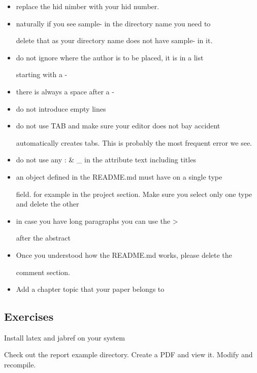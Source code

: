 \begin{itemize}

\item
  replace the hid nimber with your hid number.
\item naturally if you see sample- in the directory name you need to

  delete that as your directory name does not have sample- in it.
\item do not ignore where the author is to be placed, it is in a list

  starting with a -
\item there is always a space after a -

\item do not introduce empty lines

\item do not use TAB and make sure your editor does not bay accident

  automatically creates tabs. This is probably the most frequent error
  we see.
\item do not use any : \& \_ in the attribute text including titles

\item an object defined in the README.md must have on a single type

  field.  for example in the project section. Make sure you select
  only one type and delete the other
\item in case you have long paragraphs you can use the \textgreater{}

  after the abstract
\item Once you understood how the README.md works, please delete the

  comment section.
\item Add a chapter topic that your paper belongs to

\end{itemize}

\subsection{Exercises} \bigskip


\begin{exercise}
\label{E:Report.1}
Install latex and jabref on your system
\end{exercise}

\begin{exercise}
\label{E:Report.2}
Check out the report example directory. Create a PDF and view it. Modify
and recompile.
\end{exercise}

